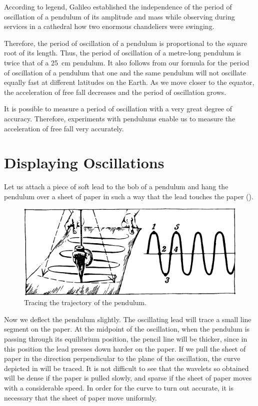 According to legend, Galileo established the independence of the period of oscillation of a pendulum of its amplitude and mass while observing during services in a cathedral how two enormous chandeliers were swinging.

Therefore, the period of oscillation of a pendulum is proportional to the square root of its length. Thus, the period of oscillation of a metre-long pendulum is twice that of a \SI{25}{\centi\meter} pendulum. It also follows from our formula for the period of oscillation of a pendulum that one and the same pendulum will not oscillate equally fast
at different latitudes on the Earth. As we move closer to the equator, the acceleration of free fall decreases and the period of oscillation grows.

It is possible to measure a period of oscillation with a
very great degree of accuracy. Therefore, experiments
with pendulums enable us to measure the acceleration
of free fall very accurately.

\section{Displaying Oscillations}
Let us attach a piece of soft lead to the bob of a pendulum and hang the pendulum over a sheet of paper in such a way that the lead touches the paper ().

\begin{figure}[!ht]
\centering
\includegraphics[width=\textwidth]{figures/fig-04-03.pdf}
\caption{Tracing the trajectory of the pendulum.}
\label{fig-4.03}
\end{figure}

Now we deflect the pendulum slightly. The oscillating
lead will trace a small line segment on the paper. At the
midpoint of the oscillation, when the pendulum is passing through its equilibrium position, the pencil line will
be thicker, since in this position the lead presses down
harder on the paper. If we pull the sheet of paper in the
direction perpendicular to the plane of the oscillation,
the curve depicted in  will be traced. It is not
difficult to see that the wavelets so obtained will be
dense if the paper is pulled slowly, and sparse if the
sheet of paper moves with a considerable speed. In order
for the curve to turn out accurate, it is necessary that
the sheet of paper move uniformly.

